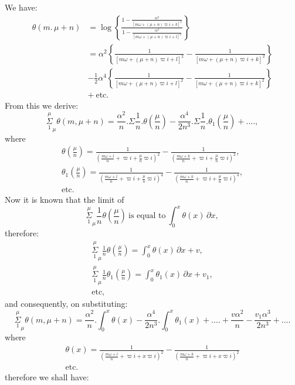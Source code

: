\documentclass{article}
\begin{document}
We have:
\[ \begin{aligned}\theta(m.\,\mu+n)&=\log\left\{\frac{1-\frac{\alpha^{2}}{[m\omega+(\mu+n)\varpi i+k]^{2}}}{1-\frac{\alpha^{2}}{[m\omega+(\mu+n)\varpi i+l]^{2}}}\right\}\\ &=\alpha^{2}\left\{\frac{1}{[m\omega+(\mu+n)\varpi i+l]^{2}}-\frac{1}{[m\omega+(\mu+n)\varpi i+k]^{2}}\right\}\\ &-\tfrac{1}{2}\alpha^{4}\left\{\frac{1}{[m\omega+(\mu+n)\varpi i+l]^{2}}-\frac{1}{[m\omega+(\mu+n)\varpi i+k]^{2}}\right\}\\ &+\ \text{etc.}\end{aligned} \]
From this we derive:
\[ \overset{\mu}{\underset{1}{\Sigma}}_{\mu}\theta(m,\mu+n)=\frac{\alpha^{2}}{n}.\Sigma\frac{1}{n}.\theta\left(\frac{\mu}{n}\right)-\frac{\alpha^{4}}{2n^{3}}.\Sigma\frac{1}{n}.\theta_{1}\left(\frac{\mu}{n}\right)+...., \]
where
\[ \begin{gathered}\theta\left(\frac{\mu}{n}\right)=\frac{1}{\left(\frac{m\omega+l}{n}+\varpi i+\frac{\mu}{n}\varpi i\right)^{2}}-\frac{1}{\left(\frac{m\omega+k}{n}+\varpi i+\frac{\mu}{n}\varpi i\right)^{2}},\\ \theta_{1}\left(\frac{\mu}{n}\right)=\frac{1}{\left(\frac{m\omega+l}{n}+\varpi i+\frac{\mu}{n}\varpi i\right)^{4}}-\frac{1}{\left(\frac{m\omega+k}{n}+\varpi i+\frac{\mu}{n}\varpi i\right)^{4}},\\ \text{etc.}\end{gathered} \]
Now it is known that the limit of
\[ \overset{\mu}{\underset{1}{\Sigma}}_{\mu}\frac{1}{n}\theta\left(\frac{\mu}{n}\right)\ \text{is equal to}\ \int_{0}^{x}\theta(x)\,\partial x, \]
therefore:
\[ \begin{gathered}\overset{\mu}{\underset{1}{\Sigma}}_{\mu}\frac{1}{n}\theta\left(\frac{\mu}{n}\right)=\int_{0}^{x}\theta(x)\,\partial x+v,\\ \overset{\mu}{\underset{1}{\Sigma}}_{\mu}\frac{1}{n}\theta_{1}\left(\frac{\mu}{n}\right)=\int_{0}^{x}\theta_{1}(x)\,\partial x+v_{1},\\ \text{etc},\end{gathered} \]
and consequently, on substituting:
\[ \overset{\mu}{\underset{1}{\Sigma}}_{\mu}\theta(m,\mu+n)=\frac{\alpha^{2}}{n}.\int_{0}^{x}\theta(x)-\frac{\alpha^{4}}{2n^{3}}.\int_{0}^{x}\theta_{1}(x)+....+\frac{v\alpha^{2}}{n}-\frac{v_{1}\alpha^{3}}{2n^{3}}+.... \]
where
\[ \begin{gathered}\theta(x)=\frac{1}{\left(\frac{m\omega+l}{n}+\varpi i+x\varpi i\right)^{2}}-\frac{1}{\left(\frac{m\omega+k}{n}+\varpi i+x\varpi i\right)^{2}}\\ \text{etc.}\end{gathered} \]
therefore we shall have:
\end{document}
